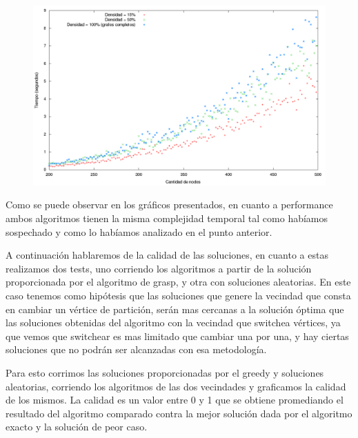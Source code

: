 \begin{figure}[H]
\begin{center}
\includegraphics[scale=0.4]{./img/PerformanceLocal3.png}
\caption{}
\end{center}
\end{figure}

Como se puede observar en los gráficos presentados, en cuanto a performance ambos algoritmos tienen la misma complejidad temporal tal como habíamos sospechado y como lo habíamos analizado en el punto anterior.

A continuación hablaremos de la calidad  de las soluciones, en cuanto a estas realizamos dos tests, uno corriendo los algoritmos a partir de la solución proporcionada por el algoritmo de grasp, y otra con soluciones aleatorias. En este caso tenemos como hipótesis que las soluciones que genere la vecindad que consta en cambiar un vértice de partición, serán mas cercanas a la solución óptima que las soluciones obtenidas del algoritmo con la vecindad que switchea vértices, ya que vemos que switchear es mas limitado que cambiar una por una, y hay ciertas soluciones que no podrán ser alcanzadas con esa metodología.

Para esto corrimos las soluciones proporcionadas por el greedy y soluciones aleatorias, corriendo los algoritmos de las dos vecindades y graficamos la calidad de los mismos. La calidad es un valor entre 0 y 1 que se obtiene promediando el resultado del algoritmo comparado contra la mejor solución dada por el algoritmo exacto y la solución de peor caso.

